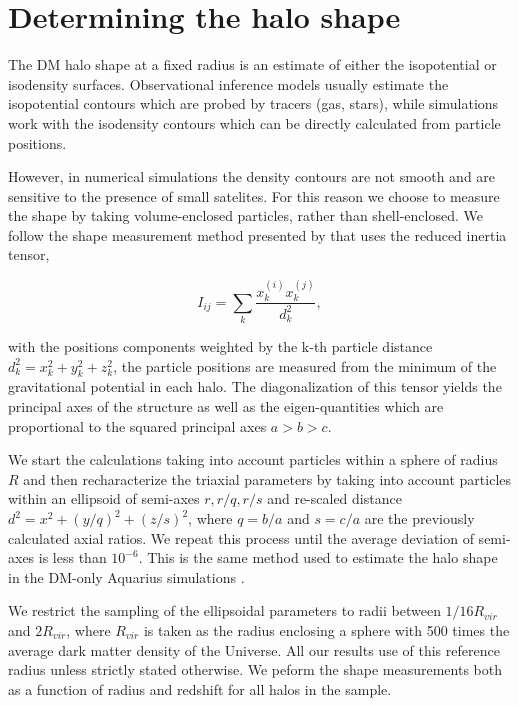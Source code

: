 \documentclass[a4paper,fleqn,usenatbib]{mnras}
\begin{document}
\section{Determining the halo shape}


The DM halo shape at a fixed radius is an estimate of either
the isopotential or isodensity surfaces.  
Observational inference models usually estimate the 
isopotential contours which are probed by tracers (gas, stars), while
simulations work with the isodensity contours which can be directly
calculated from particle positions.  

However, in numerical simulations the density contours are not smooth
and are sensitive to the presence of small satelites. 
For this reason we choose to measure the shape by taking
volume-enclosed particles, rather than shell-enclosed.  
We follow the shape measurement method presented by
\cite{Allgood_et_al._2006} that uses the reduced
inertia tensor,     

\begin{equation}
I_{ij} = \sum_k \frac{x_k^{(i)}x_k^{(j)}}{d^2_k},
\label{eq:inertia}
\end{equation}

with the positions components weighted by the k-th particle distance
$d_k^2=x_k^2+y_k^2+z_k^2$, the particle positions are measured from
the minimum of the gravitational potential in each halo.
The diagonalization of this tensor yields the principal axes of the
structure as well as the eigen-quantities which are proportional to
the squared principal axes $a>b>c$. 

We start the calculations taking into account particles within a
sphere of radius $R$ and then  recharacterize the triaxial parameters
by taking into account particles within an ellipsoid of semi-axes
$r,r/q,r/s$ and re-scaled distance $d^2=x^2+(y/q)^2+(z/s)^2$, where $q
= b/a$ and $s=c/a$ are the previously calculated axial ratios. 
We repeat this process until the average deviation of semi-axes is
less than $10^{-6}$.  
This is the same method used to estimate the halo shape in the DM-only
Aquarius simulations \citep{Vera-Ciro_et_al._2011}. 

We restrict the sampling of the ellipsoidal parameters to radii
between $1/16 R_{vir}$ and $2R_{vir}$, where  $R_{vir}$ is taken as the
radius enclosing a sphere with 500 times the average dark matter
density of the Universe. 
All our results use of this reference radius
unless strictly stated otherwise. 
We peform the shape measurements both as a function of radius and
redshift for all halos in the sample.
\end{document}

